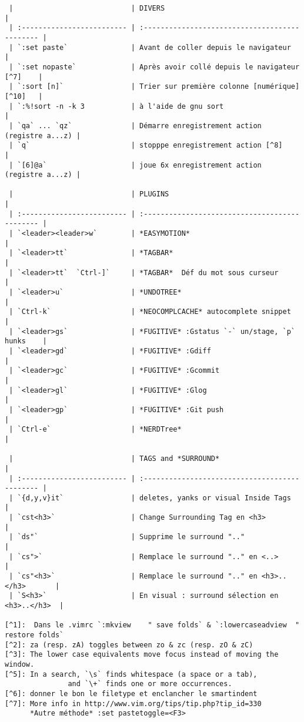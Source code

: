 \documentclass[10pt,landscape]{article}
\begin{document}
\begin{multicols}{2}
\begin{verbatim}
 |                            | DIVERS                                         |
 | :------------------------- | :--------------------------------------------- |
 | `:set paste`               | Avant de coller depuis le navigateur           |
 | `:set nopaste`             | Après avoir collé depuis le navigateur [^7]    |
 | `:sort [n]`                | Trier sur première colonne [numérique] [^10]   |
 | `:%!sort -n -k 3           | à l'aide de gnu sort                           |
 | `qa` ... `qz`              | Démarre enregistrement action (registre a...z) |
 | `q`                        | stopppe enregistrement action [^8]             |
 | `[6]@a`                    | joue 6x enregistrement action (registre a...z) |

 |                            | PLUGINS                                        |
 | :------------------------- | :--------------------------------------------- |
 | `<leader><leader>w`        | *EASYMOTION*                                   |
 | `<leader>tt`               | *TAGBAR*                                       |
 | `<leader>tt`  `Ctrl-]`     | *TAGBAR*  Déf du mot sous curseur              |
 | `<leader>u`                | *UNDOTREE*                                     |
 | `Ctrl-k`                   | *NEOCOMPLCACHE* autocomplete snippet           |
 | `<leader>gs`               | *FUGITIVE* :Gstatus `-` un/stage, `p` hunks    |
 | `<leader>gd`               | *FUGITIVE* :Gdiff                              |
 | `<leader>gc`               | *FUGITIVE* :Gcommit                            |
 | `<leader>gl`               | *FUGITIVE* :Glog                               |
 | `<leader>gp`               | *FUGITIVE* :Git push                           |
 | `Ctrl-e`                   | *NERDTree*                                     |

 |                            | TAGS and *SURROUND*                            |
 | :------------------------- | :--------------------------------------------- |
 | `{d,y,v}it`                | deletes, yanks or visual Inside Tags           |
 | `cst<h3>`                  | Change Surrounding Tag en <h3>                 |
 | `ds"`                      | Supprime le surround ".."                      |
 | `cs">`                     | Remplace le surround ".." en <..>              |
 | `cs"<h3>`                  | Remplace le surround ".." en <h3>..</h3>       |
 | `S<h3>`                    | En visual : surround sélection en <h3>..</h3>  |

[^1]:  Dans le .vimrc `:mkview    " save folds` & `:lowercaseadview  " restore folds`
[^2]: za (resp. zA) toggles between zo & zc (resp. zO & zC)
[^3]: The lower case equivalents move focus instead of moving the window.
[^5]: In a search, `\s` finds whitespace (a space or a tab), 
               and `\+` finds one or more occurrences.
[^6]: donner le bon le filetype et enclancher le smartindent
[^7]: More info in http://www.vim.org/tips/tip.php?tip_id=330 
      *Autre méthode* :set pastetoggle=<F3>
\end{verbatim}
\end{multicols}
\end{document}
